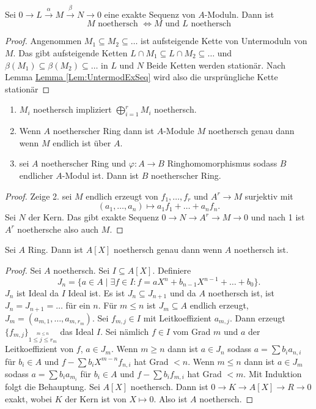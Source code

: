 \begin{Satz}
    Sei \(0\to L\stackrel{\alpha}\to M\stackrel \beta\to N\to 0\) eine exakte Sequenz von \(A\)-Moduln. Dann ist \[M \text{ noethersch } \iff M \text{ und } L \text{ noethersch}\]
\end{Satz}
\begin{proof}
    Angenommen \(M_1\subseteq M_2\subseteq \dots\) ist aufsteigende Kette von Untermoduln von \(M\). Das gibt aufsteigende Ketten
    \(L\cap M_1\subseteq L\cap M_2\subseteq \dots\) und
    \(\beta(M_1)\subseteq \beta(M_2)\subseteq \dots\) in \(L\) und \(N\) Beide Ketten werden stationär. Nach Lemma \hyperref[Lem:UntermodExSeq]{Lemma \ref{Lem:UntermodExSeq}} wird also die ursprüngliche Kette stationär
\end{proof}
\begin{Kor}
    \begin{enumerate}
        \item \(M_i\) noethersch impliziert \(\bigoplus_{i=1}^rM_i\) noethersch.
        \item Wenn \(A\) noetherscher Ring dann ist \(A\)-Module \(M\) noethersch genau dann wenn \(M\) endlich ist über \(A\).
        \item sei \(A\) noetherscher Ring und \(\varphi\colon A\to B\) Ringhomomorphismus sodass \(B\) endlicher \(A\)-Modul ist. Dann ist \(B\) noetherscher Ring.
    \end{enumerate}
\end{Kor}
\begin{proof}
    Zeige 2. sei \(M\) endlich erzeugt von \(f_1,\dots,f_r\) und \(A^r\to M\) surjektiv mit \[(a_1,\dots,a_n)\mapsto a_1f_1+\dots+a_nf_n.\] Sei \(N\) der Kern. Das gibt exakte Sequenz 
    \(0\to N\to A^r\to M\to 0\) und nach 1 ist \(A^r\) noethersche also auch \(M\).
\end{proof}
\begin{Satz} Sei \(A\) Ring.  Dann ist \(A[X]\) noethersch genau dann wenn \(A\) noethersch ist.
\end{Satz}
\begin{proof}
    Sei \(A\) noethersch.
    Sei \(I\subseteq A[X]\). Definiere \[J_n=\{a\in A\mid \exists f\in I\colon f=aX^n+b_{n-1}X^{n-1}+\dots+b_0\}.\] \(J_n\) ist Ideal da \(I\) Ideal ist. Es ist \(J_n\subseteq J_{n+1}\) und da \(A\) noethersch ist, ist \(J_n=J_{n+1}=\dots\) für ein \(n\).
    Für \(m\leq n\) ist \(J_m\subseteq A\) endlich erzeugt, \(J_m=(a_{m,1},\dots,a_{m,r_m})\). Sei \(f_{m,j}\in I\) mit Leitkoeffizient \(a_{m,j}\). Dann erzeugt \(\{f_{m,j}\}_{\stackrel{m\leq n}{1\leq j\leq r_m}}\) das Ideal \(I\). Sei nämlich \(f\in I\) vom Grad \(m\) und \(a\) der Leitkoeffizient von \(f\), \(a\in J_m\).
    Wenn \(m\geq n\) dann ist \(a\in J_n\) sodass \(a=\sum b_ia_{n,i}\) für \(b_i\in A\) und \(f-\sum b_iX^{m-n}f_{n,i}\) hat Grad \(<n\).
    Wenn \(m\leq n\) dann ist \(a\in J_m\) sodass \(a=\sum b_ia_{m_i}\) für \(b_i\in A\) und \(f-\sum b_if_{m,i}\) hat Grad \(<m\). Mit Induktion folgt die Behauptung.
    Sei \(A[X]\) noethersch. Dann ist \(0\to K\to A[X]\to R\to 0\) exakt, wobei \(K\) der Kern ist von \(X\mapsto 0\). Also ist \(A\) noethersch.
\end{proof}
